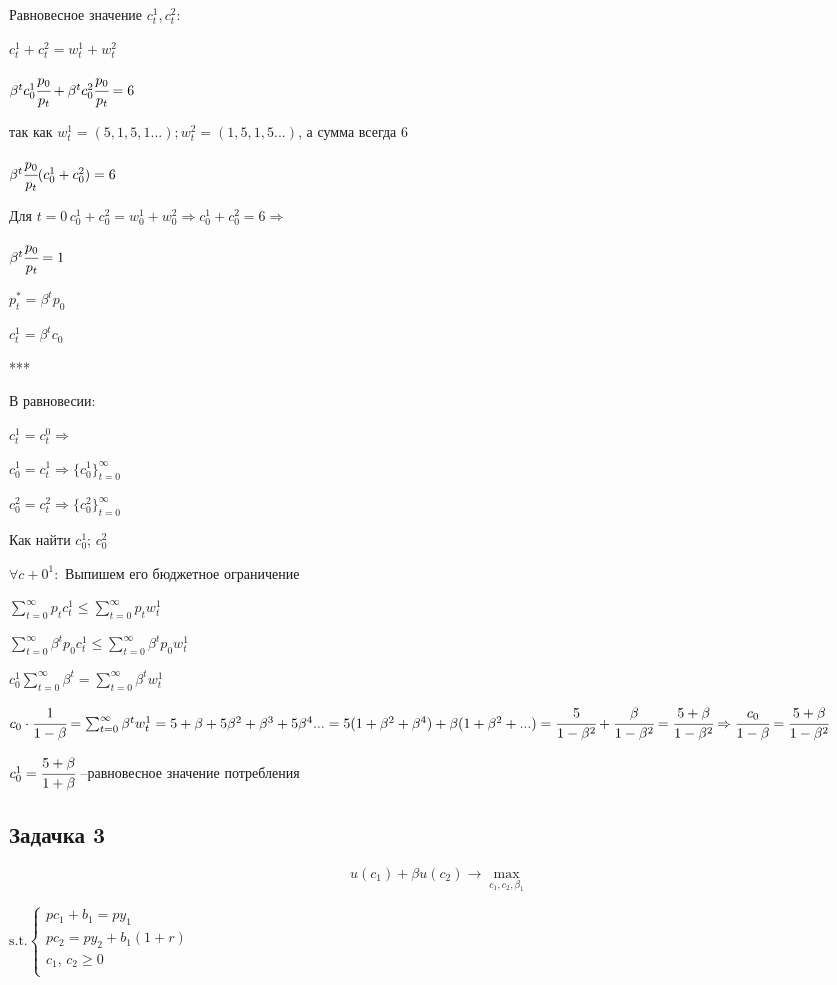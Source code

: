 \documentclass[reqno]{article}
\theoremstyle{definition}
\theoremstyle{definition}
\theoremstyle{definition}
\theoremstyle{definition}
\theoremstyle{definition}
\theoremstyle{definition}
\theoremstyle{definition}
\theoremstyle{definition}
\theoremstyle{definition}
\begin{document}
	Равновесное значение $c_t^1, c_t^2$:
	
	$c_t^1 + c_t^2 = w_t^1 + w_t^2$
	
	$\beta^t c_0^1 \cfrac{p_0}{p_t} + \beta^t c_0^2 \cfrac{p_0}{p_t} = 6$
	
	так как $w_t^1=(5,1,5,1...);w_t^2=(1,5,1,5...)$, а сумма всегда 6
	
	$\beta^t \cfrac{p_0}{p_t}(c_0^1 + c_0^2) =6$
	
	Для $t=0\, c_0^1 + c_0^2 = w_0^1 + w_0^2 \Rightarrow c_0^1 + c_0^2 = 6 \Rightarrow$
		
	$\beta^t \cfrac{p_0}{p_t} = 1$
	
	$p_t^* = \beta^t p_0$
	
	$c_t^1 = \beta^t c_0 $
	
	***
	
	В равновесии:
	
	$c_t^1 = c_t^0 \Rightarrow $
	
	$c_0^1=c_t^1 \Rightarrow \{c_0^1\}_{t=0}^\infty$
	
	$c_0^2=c_t^2 \Rightarrow \{c_0^2\}_{t=0}^\infty$
	
	Как найти $c_0^1; \, c_0^2$
	
	$\forall c+0^1:$ Выпишем его бюджетное ограничение
	
	$\sum_{t=0}^\infty p_t c_t^1 \leq \sum_{t=0}^\infty p_t w_t^1$
	
	$\sum_{t=0}^\infty \beta^t p_0 c_t^1 \leq \sum_{t=0}^\infty \beta^t p_0 w_t^1$
	
	$c_0^1 \sum_{t=0}^\infty \beta^t = \sum_{t=0}^\infty \beta^t w_t^1$
	
	$c_0 \cdot \cfrac{1}{1-\beta} = \sum_{t=0}^\infty \beta^t w_t^1 = 5 + \beta + 5 \beta^2 + \beta^3 + 5 \beta^4 ... = 5(1+\beta^2+\beta^4) + \beta(1+\beta^2+...) = \cfrac{5}{1-\beta^2}+\cfrac{\beta}{1-\beta^2} = \cfrac{5+\beta}{1-\beta^2}\Rightarrow \cfrac{c_0}{1-\beta} = \cfrac{5+\beta}{1-\beta^2} $
	
	$c_0^1 = \cfrac{5+\beta}{1+\beta}$ --равновесное значение потребления 
	
	\subsection{Задачка 3}
	
	$$u(c_1)+\beta u(c_2) \rightarrow \max\limits_{c_1,c_2,\beta_1}$$
	
	$
	\text{s.t.}
	\begin{cases}
		p c_1 + b_1 = p y_1\\
		
		p c_2 = p y_2 + b_1 (1+r)\\
		
		c_1, \, c_2 \geq 0\\
	\end{cases}
	$
	
	
	
		
\end{document}
